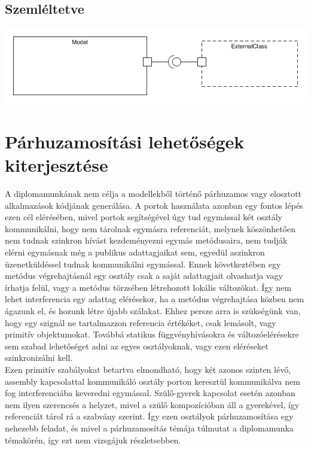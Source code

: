 \documentclass[a4paper,12pt]{report}
\begin{document}
\subsection{Szemléltetve}
\includegraphics[scale=0.6]{external_with_ports.png} \\


\section{Párhuzamosítási lehetőségek kiterjesztése}
A diplomamunkának nem célja a modellekből történő párhuzamos vagy elosztott alkalmazások kódjának generálása. A portok használata azonban egy fontos lépés ezen cél elérésében, mivel portok segítségével úgy tud egymással két osztály kommunikálni, hogy nem tárolnak egymásra referenciát, melynek köszönhetően nem tudnak szinkron hívást kezdeményezni egymás metódusaira, nem tudják elérni egymásnak még a publikus adattagjaikat sem, egyedül aszinkron üzenetküldéssel tudnak kommunikálni egymással. Ennek következtében egy metódus végrehajtásnál egy osztály csak a saját adattagjait olvashatja vagy írhatja felül, vagy a metódus törzsében létrehozott lokális változókat. Így nem lehet interferencia egy adattag elérésekor, ha a metódus végrehajtása közben nem ágazunk el, és hozunk létre újabb szálakat. Ehhez persze arra is szükségünk van, hogy egy szignál ne tartalmazzon referencia értékéket, csak lemásolt, vagy primitív objektumokat. Továbbá statikus függvényhívásokra és változóelérésekre sem szabad lehetőséget adni az egyes osztályoknak, vagy ezen eléréseket szinkronizálni kell. \\

Ezen primitív szabályokat betartva elmondható, hogy két azonos szinten lévő, assembly kapcsolattal kommunikáló osztály porton keresztül kommunikálva nem fog interferenciába keveredni egymással. Szülő-gyerek kapcsolat esetén azonban nem ilyen szerencsés a helyzet, mivel a szülő kompozícióban áll a gyerekével, így referenciát tárol rá a szabvány szerint. Így ezen osztályok párhuzamosítása egy nehezebb feladat, és mivel a párhuzamosítás témája túlmutat a diplomamunka témakörén, így ezt nem vizsgájuk részletsebben.
\end{document}
